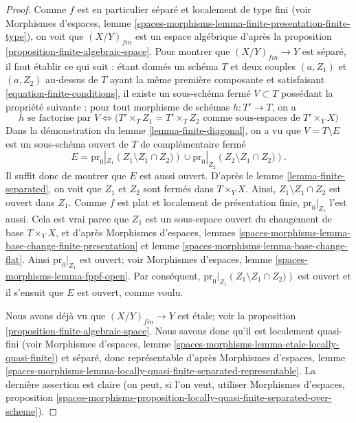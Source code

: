 \begin{proof}
Comme $f$ est en particulier séparé et localement de type fini (voir
Morphismes d'espaces,
lemme \ref{spaces-morphisms-lemma-finite-presentation-finite-type}),
on voit que $(X/Y)_{fin}$ est un espace algébrique d'après la
proposition \ref{proposition-finite-algebraic-space}.
Pour montrer que $(X/Y)_{fin} \to Y$ est séparé, il faut établir
ce qui suit : étant donnés un schéma $T$ et deux couples $(a, Z_1)$ et $(a, Z_2)$
au-dessus de $T$
ayant la même première composante et satisfaisant \ref{equation-finite-conditions},
il existe un sous-schéma fermé $V \subset T$ possédant la propriété suivante :
pour tout morphisme de schémas $h : T' \to T$, on a
$$
h \text{ se factorise par } V \Leftrightarrow
\Big(T' \times_T Z_1 = T' \times_T Z_2
\text{ comme sous-espaces de }T' \times_Y X\Big)
$$
Dans la démonstration du
lemme \ref{lemma-finite-diagonal},
on a vu que $V = T \setminus E$ est un sous-schéma ouvert de $T$
de complémentaire fermé
$$
E =
\text{pr}_0|_{Z_1}\left(Z_1 \setminus Z_1 \cap Z_2)\right)
\cup
\text{pr}_0|_{Z_2}\left(Z_2 \setminus Z_1 \cap Z_2)\right).
$$
Il suffit donc de montrer que $E$ est aussi ouvert. D'après le
lemme \ref{lemma-finite-separated},
on voit que $Z_1$ et $Z_2$ sont fermés dans $T \times_Y X$. Ainsi,
$Z_1 \setminus Z_1 \cap Z_2$ est ouvert dans $Z_1$. Comme $f$ est plat et
localement de présentation finie, $\text{pr}_0|_{Z_1}$ l'est aussi.
Cela est vrai parce que $Z_1$ est un sous-espace ouvert du changement de base
$T \times_Y X$, et d'après
Morphismes d'espaces,
lemmes \ref{spaces-morphisms-lemma-base-change-finite-presentation} et
lemme \ref{spaces-morphisms-lemma-base-change-flat}.
Ainsi $\text{pr}_0|_{Z_1}$ est ouvert; voir
Morphismes d'espaces, lemme \ref{spaces-morphisms-lemma-fppf-open}.
Par conséquent, $\text{pr}_0|_{Z_1}\left(Z_1 \setminus Z_1 \cap Z_2)\right)$ est
ouvert et il s'ensuit que $E$ est ouvert, comme voulu.

\medskip\noindent
Nous avons déjà vu que $(X/Y)_{fin} \to Y$ est étale; voir la
proposition \ref{proposition-finite-algebraic-space}.
Nous savons donc qu'il est localement quasi-fini (voir
Morphismes d'espaces,
lemme \ref{spaces-morphisms-lemma-etale-locally-quasi-finite})
et séparé, donc représentable d'après
Morphismes d'espaces, lemme
\ref{spaces-morphisms-lemma-locally-quasi-finite-separated-representable}.
La dernière assertion est claire (on peut, si l'on veut, utiliser
Morphismes d'espaces, proposition
\ref{spaces-morphisms-proposition-locally-quasi-finite-separated-over-scheme}).
\end{proof}

